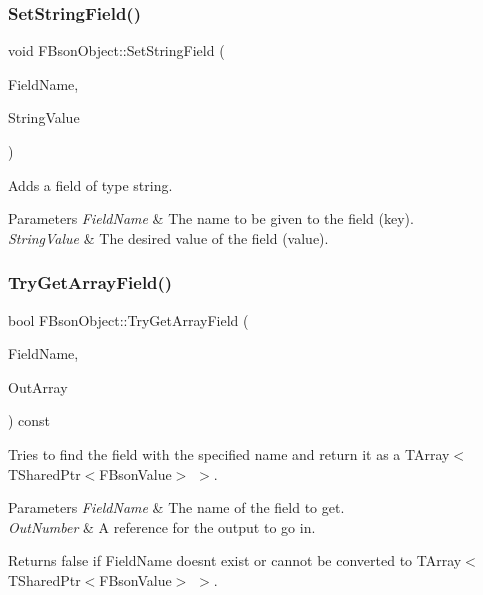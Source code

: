 \subsubsection{\texorpdfstring{Set\+String\+Field()}{SetStringField()}}
{\footnotesize\ttfamily void F\+Bson\+Object\+::\+Set\+String\+Field (\begin{DoxyParamCaption}\item[{const F\+String \&}]{Field\+Name,  }\item[{const F\+String \&}]{String\+Value }\end{DoxyParamCaption})}

Adds a field of type string.


\begin{DoxyParams}{Parameters}
{\em Field\+Name} & The name to be given to the field (key). \\
\hline
{\em String\+Value} & The desired value of the field (value). \\
\hline
\end{DoxyParams}
\mbox{\label{class_f_bson_object_ad7c32dcbaf34aef08880ff2bf033f1bb}} 
\subsubsection{\texorpdfstring{Try\+Get\+Array\+Field()}{TryGetArrayField()}}
{\footnotesize\ttfamily bool F\+Bson\+Object\+::\+Try\+Get\+Array\+Field (\begin{DoxyParamCaption}\item[{const F\+String \&}]{Field\+Name,  }\item[{T\+Array$<$ T\+Shared\+Ptr$<$ \mbox{\hyperlink{class_f_bson_value}{F\+Bson\+Value}} $>$$>$ \&}]{Out\+Array }\end{DoxyParamCaption}) const}

Tries to find the field with the specified name and return it as a T\+Array$<$ T\+Shared\+Ptr$<$\+F\+Bson\+Value$>$ $>$.


\begin{DoxyParams}{Parameters}
{\em Field\+Name} & The name of the field to get. \\
\hline
{\em Out\+Number} & A reference for the output to go in. \\
\hline
\end{DoxyParams}
\begin{DoxyReturn}{Returns}
false if Field\+Name doesn\textquotesingle{}t exist or cannot be converted to T\+Array$<$ T\+Shared\+Ptr$<$\+F\+Bson\+Value$>$ $>$. 
\end{DoxyReturn}
\mbox{\label{class_f_bson_object_ae5bc67e3ece644f8de1c2c9921d14aad}} 
